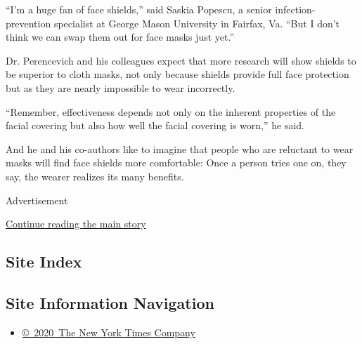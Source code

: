 ``I'm a huge fan of face shields,'' said Saskia Popescu, a senior
infection-prevention specialist at George Mason University in Fairfax,
Va. ``But I don't think we can swap them out for face masks just yet.''

Dr. Perencevich and his colleagues expect that more research will show
shields to be superior to cloth masks, not only because shields provide
full face protection but as they are nearly impossible to wear
incorrectly.

``Remember, effectiveness depends not only on the inherent properties of
the facial covering but also how well the facial covering is worn,'' he
said.

And he and his co-authors like to imagine that people who are reluctant
to wear masks will find face shields more comfortable: Once a person
tries one on, they say, the wearer realizes its many benefits.

Advertisement

\protect\hyperlink{after-bottom}{Continue reading the main story}

\hypertarget{site-index}{%
\subsection{Site Index}\label{site-index}}

\hypertarget{site-information-navigation}{%
\subsection{Site Information
Navigation}\label{site-information-navigation}}

\begin{itemize}
\tightlist
\item
  \href{https://help.nytimes3xbfgragh.onion/hc/en-us/articles/115014792127-Copyright-notice}{©~2020~The
  New York Times Company}
\end{itemize}

